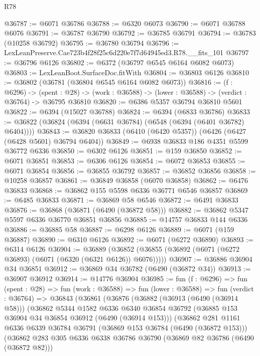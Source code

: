 \begin{lexlean}{R78}
\begin{coremodule}
@36787 := @6071 @36786
@36788 := @6320 @6073
@36790 := @6071 @36788 @6076
@36791 := @36787 @36790
@36792 := @36785 @36791
@36794 := @36783 (@10258 @36792)
@36795 := @36780 @36794
@36796 := LexLeanPreserve.Cae723b4f28f25c6d220e7f7d64945ed3.R78.__fits_101
@36797 := @36796 @6126
@36802 := @6372 (@36797 @6545 @6164 @6082 @6073)
@36803 := LexLeanBoot.SurfaceDoc.fitWith
@36804 := @36803 @6126
@36810 := @36802 (@36781 (@36804 @6545 @6164 @6082 @6073))
@36816 := (f : @6296) ->
  (spent : @28) -> (work : @36588) -> (lower : @36588) -> (verdict : @36764) -> @36795 @36810
@36820 := @6386 @5357 @36794 @36810 @5601
@36822 := @6394 (@15027 @36788)
@36824 := @6394 (@6833 @36786)
@36833 := @36822 (@36824 (@6394 (@6631 @36784) (@6548 (@6394 (@6401 @36782) @6404))))
@36843 := @36820 @36833 (@6410 (@6420 @5357)) (@6426 (@6427 (@6428 @5601) @36794 @6404))
@36849 := @6938 @36833 @186 @4351 @5599 @36772 @6336
@36850 := @6302 @6126
@36851 := @159 @36850
@36852 := @6071 @36851
@36853 := @6306 @6126
@36854 := @6072 @36853
@36855 := @6071 @36854
@36856 := @36855 @36792
@36857 := @36852 @36856
@36858 := @10258 @36857
@36861 := @36849 @36858 (@6070 @36858)
@36862 := @6476 @36833
@36868 := @36862 @155 @5598 @6336 @36771 @6546 @36857
@36869 := @6485 @36833
@36871 := @36869 @58 @6546
@36872 := @6491 @36833
@36876 := @36868 (@36871 (@6490 (@36872 @58)))
@36882 := @36862 @5347 @5597 @6336 @36770 @36851 @36856
@36885 := @14757 @36833 @144 @6336
@36886 := @36885 @58
@36887 := @6298 @6126
@36889 := @6071 (@159 @36887)
@36890 := @6310 @6126
@36892 := @6071 (@6272 @36890)
@36893 := @6314 @6126
@36904 := @36889
    (@36852 (@36855 (@36892 (@6071 (@6272 @36893) (@6071 (@6320 (@6321 @6126)) @6076)))))
@36907 := @36886 @36904 @34 @36851
@36912 := @36869 @34 @36782 (@6490 (@36872 @34))
@36913 := @36907 @36912
@36914 := @14776 @36904
@36985 := fun (f : @6296) =>
  fun (spent : @28) =>
  fun (work : @36588) =>
  fun (lower : @36588) =>
  fun (verdict : @36764) =>
  @36843
    (@36861
      (@36876
        (@36882
          (@36913 (@6490 (@36914 @58)))
          (@36862
            @5344
            @1582
            @6336
            @6340
            @36854
            @36792
            (@36885 @153 @36904 @34 @36854 @36912 (@6490 (@36914 @153)))
            (@36862
              @281
              @1161
              @6336
              @6339
              @36784
              @36791
              (@36869 @153 @36784 (@6490 (@36872 @153)))
              (@36862
                @283
                @305
                @6336
                @6338
                @36786
                @36790
                (@36869 @82 @36786 (@6490 (@36872 @82)))

\end{coremodule}
\end{lexlean}
